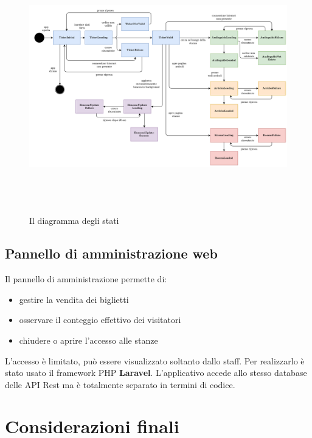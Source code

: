 \documentclass[12pt]{article}
\begin{document}
\begin{center}
    \begin{figure}[htp]
        \centering
        \includegraphics[height=11cm]{diagrams/state_diagrams.png}
        \caption{Il diagramma degli stati}
        \label{fig:state_diagrans}
    \end{figure}
\end{center}
    

\subsection{Pannello di amministrazione web}
Il pannello di amministrazione permette di:
\begin{itemize}
    \item gestire la vendita dei biglietti
    \item osservare il conteggio effettivo dei visitatori
    \item chiudere o aprire l’accesso alle stanze
\end{itemize}
L'accesso è limitato, può essere visualizzato soltanto dallo staff. Per realizzarlo è stato usato il framework PHP \textbf{Laravel}. L'applicativo accede allo stesso database delle API Rest ma è totalmente separato in termini di codice. 





\section{Considerazioni finali}
\end{document}
